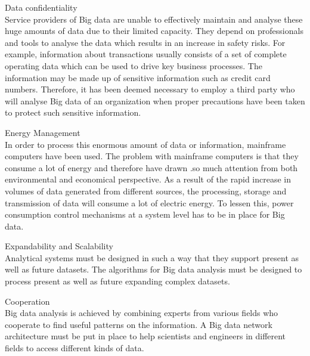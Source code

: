 \documentclass[conference]{IEEEtran}
\begin{document}
Data confidentiality  \\

Service providers of Big data are unable to effectively maintain and analyse these huge amounts of data due to their limited capacity. They depend on professionals and tools to analyse the data which results in an increase in safety risks. For example, information about transactions usually consists of a set of complete operating data which can be used to drive key business processes.  The information may be made up of sensitive information such as credit card numbers. Therefore, it has been deemed necessary to employ a third party who will analyse Big data of an organization when proper precautions have been taken to protect such sensitive information.

Energy Management \\

In order to process this enormous amount of data or information, mainframe computers have been used. The problem with mainframe computers is that they consume a lot of energy and therefore have drawn .so much attention from both environmental and economical perspective. As a result of the rapid increase in volumes of data generated from different sources, the processing, storage and transmission of data will consume a lot of electric energy.  To lessen this, power consumption control mechanisms at a system level has to be in place for Big data. 

Expandability and Scalability \\

Analytical systems must be designed in such a way that they support present as well as future datasets. The algorithms for Big data analysis must be designed to process present as well as future expanding complex datasets.

Cooperation \\

Big data analysis is achieved by combining experts from various fields who cooperate to find useful patterns on the information. A Big data network architecture must be put in place to help scientists and engineers in different fields to access different kinds of data.
\end{document}
